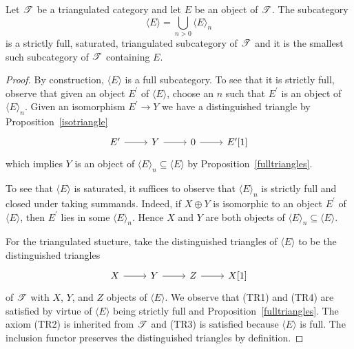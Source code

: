 \documentclass[10pt]{amsart}
\begin{document}
\begin{prop}
  Let $\mathscr{T}$ be a triangulated category and let $E$ be an object of $\mathscr{T}$.
  The subcategory
  $$\langle E \rangle = \bigcup_{n > 0} \langle E \rangle_n$$
  is a strictly full, saturated, triangulated subcategory of $\mathscr{T}$ and it is the smallest such subcategory of $\mathscr{T}$ containing $E$.

  \begin{proof}
    By construction, $\langle E \rangle$ is a full subcategory.
    To see that it is strictly full, observe that given an object $E^\prime$ of $\langle E \rangle$, choose an $n$ such that $E^\prime$ is an object of $\langle E \rangle_n$.
    Given an isomorphism $E^\prime \rightarrow Y$ we have a distinguished triangle by Proposition~\ref{isotriangle}
    $$\begin{tikzcd}
      E^\prime \arrow{r} & Y \arrow{r} & 0 \arrow{r} & E^\prime[1]
    \end{tikzcd}$$
    which implies $Y$ is an object of $\langle E \rangle_n \subseteq \langle E \rangle$ by Proposition~\ref{fulltriangles}.
    
    To see that $\langle E \rangle$ is saturated, it suffices to observe that $\langle E \rangle_n$ is strictly full and closed under taking summands.
    Indeed, if $X \oplus Y$ is isomorphic to an object $E^\prime$ of $\langle E \rangle$, then $E^\prime$ lies in some $\langle E \rangle_n$.
    Hence $X$ and $Y$ are both objects of $\langle E \rangle_n \subseteq \langle E \rangle$.
    
    For the triangulated stucture, take the distinguished triangles of $\langle E \rangle$ to be the distinguished triangles 
    $$\begin{tikzcd}
      X \arrow{r} & Y \arrow{r} & Z \arrow{r} & X[1]
    \end{tikzcd}$$
    of $\mathscr{T}$ with $X$, $Y$, and $Z$ objects of $\langle E \rangle$.
    We observe that (TR1) and (TR4) are satisfied by virtue of $\langle E \rangle$ being strictly full and Proposition~\ref{fulltriangles}.
    The axiom (TR2) is inherited from $\mathscr{T}$ and (TR3) is satisfied because $\langle E \rangle$ is full.
    The inclusion functor preserves the distinguished triangles by definition.


\end{proof}
\end{prop}
\end{document}

